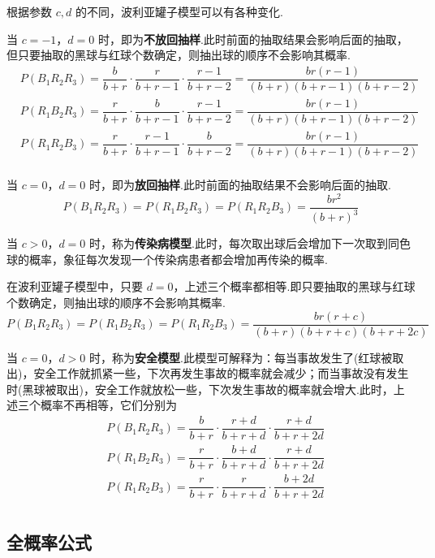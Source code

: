 \begin{note}
    \indent 根据参数 $c,d$ 的不同，波利亚罐子模型可以有各种变化.

    当 $c=-1$，$d=0$ 时，即为\textbf{不放回抽样}.此时前面的抽取结果会影响后面的抽取，但只要抽取的黑球与红球个数确定，则抽出球的顺序不会影响其概率.
    $$
    \begin{aligned}
        & P(B_1 R_2 R_3) = \dfrac{b}{b+r} \cdot \dfrac{r}{b+r-1} \cdot \dfrac{r-1}{b+r-2} = \dfrac{br(r-1)}{(b+r)(b+r-1)(b+r-2)} \\
        & P(R_1 B_2 R_3) = \dfrac{r}{b+r} \cdot \dfrac{b}{b+r-1} \cdot \dfrac{r-1}{b+r-2} = \dfrac{br(r-1)}{(b+r)(b+r-1)(b+r-2)} \\
        & P(R_1 R_2 B_3) = \dfrac{r}{b+r} \cdot \dfrac{r-1}{b+r-1} \cdot \dfrac{b}{b+r-2} = \dfrac{br(r-1)}{(b+r)(b+r-1)(b+r-2)} \\
    \end{aligned}
    $$

    当 $c=0$，$d=0$ 时，即为\textbf{放回抽样}.此时前面的抽取结果不会影响后面的抽取.
    $$
    P(B_1 R_2 R_3) = P(R_1 B_2 R_3) = P(R_1 R_2 B_3) = \dfrac{br^2}{(b+r)^3}
    $$

    当 $c>0$，$d=0$ 时，称为\textbf{传染病模型}.此时，每次取出球后会增加下一次取到同色球的概率，象征每次发现一个传染病患者都会增加再传染的概率.

    在波利亚罐子模型中，只要 $d=0$，上述三个概率都相等.即只要抽取的黑球与红球个数确定，则抽出球的顺序不会影响其概率.
    $$
    P(B_1 R_2 R_3) = P(R_1 B_2 R_3) = P(R_1 R_2 B_3) = \dfrac{br(r+c)}{(b+r)(b+r+c)(b+r+2c)}
    $$

    当 $c=0$，$d>0$ 时，称为\textbf{安全模型}.此模型可解释为：每当事故发生了(红球被取出)，安全工作就抓紧一些，下次再发生事故的概率就会减少；而当事故没有发生时(黑球被取出)，安全工作就放松一些，下次发生事故的概率就会增大.此时，上述三个概率不再相等，它们分别为
    $$
    \begin{aligned}
        & P(B_1 R_2 R_3) = \dfrac{b}{b+r} \cdot \dfrac{r+d}{b+r+d} \cdot \dfrac{r+d}{b+r+2d} \\
        & P(R_1 B_2 R_3) = \dfrac{r}{b+r} \cdot \dfrac{b+d}{b+r+d} \cdot \dfrac{r+d}{b+r+2d} \\
        & P(R_1 R_2 B_3) = \dfrac{r}{b+r} \cdot \dfrac{r}{b+r+d} \cdot \dfrac{b+2d}{b+r+2d} \\
    \end{aligned}
    $$
\end{note}

\subsection{全概率公式}

